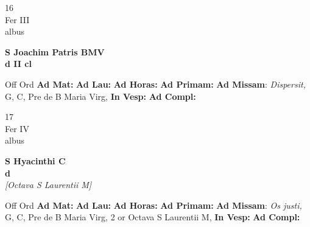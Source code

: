 \documentclass[10pt, openany]{book}
\begin{document}
    \begin{center}
        \begin{minipage}{3.5in}
            \vspace{2em}
            \begin{minipage}{0.5in}
                {\Huge 16} \\
                {\normalsize Fer III} \\
                {\normalsize albus}
            \end{minipage}
            \begin{minipage}{3.0in}
                \textbf{ \large S Joachim Patris BMV \\
                \textnormal{\normalsize d II cl}} \\ 
            \end{minipage}
            \begin{justify}Off Ord
                \textbf{Ad Mat: }
                \textbf{Ad Lau: }
                \textbf{Ad Horas: }
                \textbf{Ad Primam: }\textbf{Ad Missam}: \textit{Dispersit,} G, C, Pre de B Maria Virg,  
                \textbf{In Vesp: }
                \textbf{Ad Compl: }
            \end{justify}
        \end{minipage}
    \end{center}

    \begin{center}
        \begin{minipage}{3.5in}
            \vspace{2em}
            \begin{minipage}{0.5in}
                {\Huge 17} \\
                {\normalsize Fer IV} \\
                {\normalsize albus}
            \end{minipage}
            \begin{minipage}{3.0in}
                \textbf{ \large S Hyacinthi C \\
                \textnormal{\normalsize d}} \\ \textit{[Octava S Laurentii M]} \\ 
            \end{minipage}
            \begin{justify}Off Ord
                \textbf{Ad Mat: }
                \textbf{Ad Lau: }
                \textbf{Ad Horas: }
                \textbf{Ad Primam: }\textbf{Ad Missam}: \textit{Os justi,} G, C, Pre de B Maria Virg, 2 or Octava S Laurentii M,  
                \textbf{In Vesp: }
                \textbf{Ad Compl: }
            \end{justify}
        \end{minipage}
    \end{center}
\end{document}
